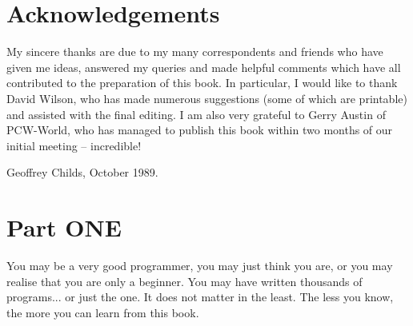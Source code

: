 \documentclass[]{report} %
\begin{document}
\tableofcontents

%
%
%
%
%
%
%
%
%
%
%


\section{Acknowledgements}
My sincere thanks are due to my many correspondents and friends who have given 
me  ideas,  answered  my  queries and made helpful  comments  which  have  all 
contributed  to the preparation of this book. In particular, I would  like  to 
thank  David  Wilson,  who has made numerous suggestions (some  of  which  are 
printable)  and  assisted with the final editing. I am also very  grateful  to 
Gerry  Austin  of PCW-World, who has managed to publish this book  within  two 
months of our initial meeting -- incredible!

Geoffrey Childs, October 1989.

\section{Part ONE}
You  may  be a very good programmer, you may just think you are,  or  you  may 
realise  that  you  are only a beginner. You may  have  written  thousands  of 
programs...  or  just the one. It does not matter in the least. The  less  you 
know, the more you can learn from this book.
\end{document}
